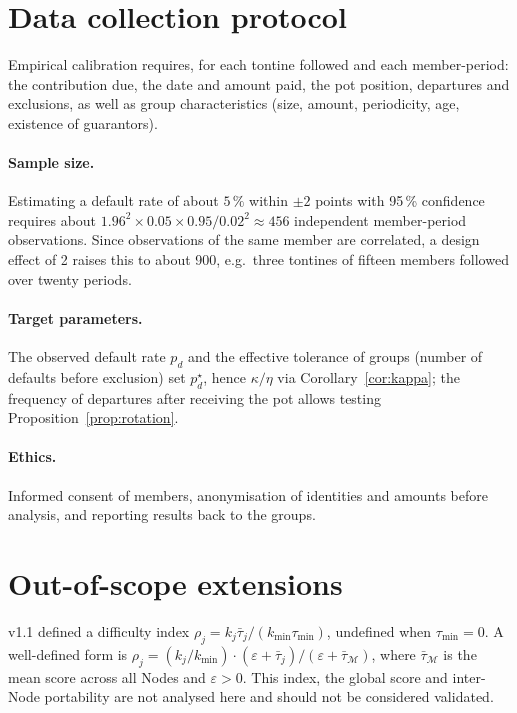 \documentclass[11pt,a4paper]{article}
\theoremstyle{plain}
\theoremstyle{definition}
\theoremstyle{remark}
\newcommand{\1}{\mathbf{1}}
\begin{document}
\section{Data collection protocol}
\label{app:data}

Empirical calibration requires, for each tontine followed and each
member-period: the contribution due, the date and amount paid, the pot
position, departures and exclusions, as well as group characteristics (size,
amount, periodicity, age, existence of guarantors).

\paragraph{Sample size.} Estimating a default rate of about $5\,\%$ within
$\pm2$ points with 95\,\% confidence requires about
$1.96^2\times0.05\times0.95/0.02^2\approx456$ independent member-period
observations. Since observations of the same member are correlated, a design
effect of 2 raises this to about 900, e.g.\ three tontines of fifteen members
followed over twenty periods.

\paragraph{Target parameters.} The observed default rate $p_d$ and the
effective tolerance of groups (number of defaults before exclusion) set
$p^\star_d$, hence $\kappa/\eta$ via Corollary~\ref{cor:kappa}; the frequency of
departures after receiving the pot allows testing
Proposition~\ref{prop:rotation}.

\paragraph{Ethics.} Informed consent of members, anonymisation of identities and
amounts before analysis, and reporting results back to the groups.

\section{Out-of-scope extensions}
\label{app:extensions}

v1.1 defined a difficulty index $\rho_j=k_j\bar\tau_j/(k_{\min}\tau_{\min})$,
undefined when $\tau_{\min}=0$. A well-defined form is
$\rho_j=(k_j/k_{\min})\cdot(\varepsilon+\bar\tau_j)/(\varepsilon+\bar\tau_{\mathcal M})$,
where $\bar\tau_{\mathcal M}$ is the mean score across all Nodes and
$\varepsilon>0$. This index, the global score and inter-Node portability are
not analysed here and should not be considered validated.
\end{document}
